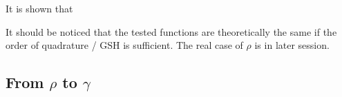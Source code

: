 \begin{table}[h]
\begin{centering}
{}
\par\end{centering}

\begin{centering}
\par\end{centering}

\caption{Logarithm of maximum absolute error $\lg\left(E_{a}^{\mathrm{max}}\right)$
introduced by a forward-backward GSHT process. \label{tab:error-gsh}}
\end{table}


It is shown that

It should be noticed that the tested functions are theoretically the
same if the order of quadrature / GSH is sufficient. The real case
of $\rho$ is in later session.


\subsection{From $\rho$ to $\gamma$}

